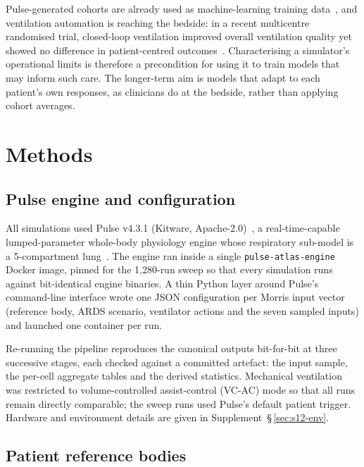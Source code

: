 \documentclass[pdflatex,sn-nature]{sn-jnl}%
\begin{document}
Pulse-generated cohorts are already used as machine-learning training data~\cite{ward2024ventilator}, and ventilation automation is reaching the bedside: in a recent multicentre randomised trial, closed-loop ventilation improved overall ventilation quality yet showed no difference in patient-centred outcomes~\cite{sinnige2026active}. Characterising a simulator's operational limits is therefore a precondition for using it to train models that may inform such care. The longer-term aim is models that adapt to each patient's own responses, as clinicians do at the bedside, rather than applying cohort averages.

\section{Methods}\label{sec:methods}

\subsection{Pulse engine and configuration}\label{sec:methods-pulse}

All simulations used Pulse v4.3.1 (Kitware, Apache-2.0)~\cite{bray2019}, a real-time-capable lumped-parameter whole-body physiology engine whose respiratory sub-model is a 5-compartment lung~\cite{pulserespmethod}. The engine ran inside a single \texttt{pulse-atlas-engine} Docker image, pinned for the 1{,}280-run sweep so that every simulation runs against bit-identical engine binaries. A thin Python layer around Pulse's command-line interface wrote one JSON configuration per Morris input vector (reference body, ARDS scenario, ventilator actions and the seven sampled inputs) and launched one container per run.

Re-running the pipeline reproduces the canonical outputs bit-for-bit at three successive stages, each checked against a committed artefact: the input sample, the per-cell aggregate tables and the derived statistics. Mechanical ventilation was restricted to volume-controlled assist-control (VC-AC) mode so that all runs remain directly comparable; the sweep runs used Pulse's default patient trigger. Hardware and environment details are given in Supplement~\S\,\ref{sec:s12-env}.

\subsection{Patient reference bodies}\label{sec:methods-patients}
\end{document}
